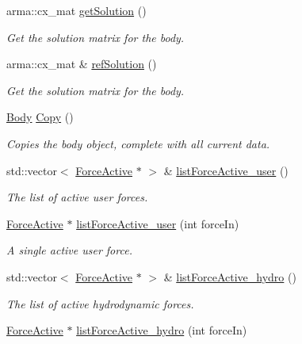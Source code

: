 \begin{DoxyCompactItemize}
arma\-::cx\-\_\-mat \hyperlink{classosea_1_1ofreq_1_1_body_a5153b4cfad5bf12ae6f279a5e7190c31}{get\-Solution} ()
\begin{DoxyCompactList}\small\item\em Get the solution matrix for the body. \end{DoxyCompactList}\item 
arma\-::cx\-\_\-mat \& \hyperlink{classosea_1_1ofreq_1_1_body_ae799af5531c35381830061f6abc0bb17}{ref\-Solution} ()
\begin{DoxyCompactList}\small\item\em Get the solution matrix for the body. \end{DoxyCompactList}\item 
\hyperlink{classosea_1_1ofreq_1_1_body}{Body} \hyperlink{classosea_1_1ofreq_1_1_body_a370dc9a5702d93d9295a9618ebdef456}{Copy} ()
\begin{DoxyCompactList}\small\item\em Copies the body object, complete with all current data. \end{DoxyCompactList}\item 
std\-::vector$<$ \hyperlink{classosea_1_1ofreq_1_1_force_active}{Force\-Active} $\ast$ $>$ \& \hyperlink{classosea_1_1ofreq_1_1_body_ab9373ca18d09e89a2ba535c66fa92760}{list\-Force\-Active\-\_\-user} ()
\begin{DoxyCompactList}\small\item\em The list of active user forces. \end{DoxyCompactList}\item 
\hyperlink{classosea_1_1ofreq_1_1_force_active}{Force\-Active} $\ast$ \hyperlink{classosea_1_1ofreq_1_1_body_ad55994a87e95520959a2d236e02168ea}{list\-Force\-Active\-\_\-user} (int force\-In)
\begin{DoxyCompactList}\small\item\em A single active user force. \end{DoxyCompactList}\item 
std\-::vector$<$ \hyperlink{classosea_1_1ofreq_1_1_force_active}{Force\-Active} $\ast$ $>$ \& \hyperlink{classosea_1_1ofreq_1_1_body_a2169495533eebe0f4f05d9e2cb71f42b}{list\-Force\-Active\-\_\-hydro} ()
\begin{DoxyCompactList}\small\item\em The list of active hydrodynamic forces. \end{DoxyCompactList}\item 
\hyperlink{classosea_1_1ofreq_1_1_force_active}{Force\-Active} $\ast$ \hyperlink{classosea_1_1ofreq_1_1_body_aa83129940f0eb3a27686b35292bf3339}{list\-Force\-Active\-\_\-hydro} (int force\-In)

\end{DoxyCompactItemize}
